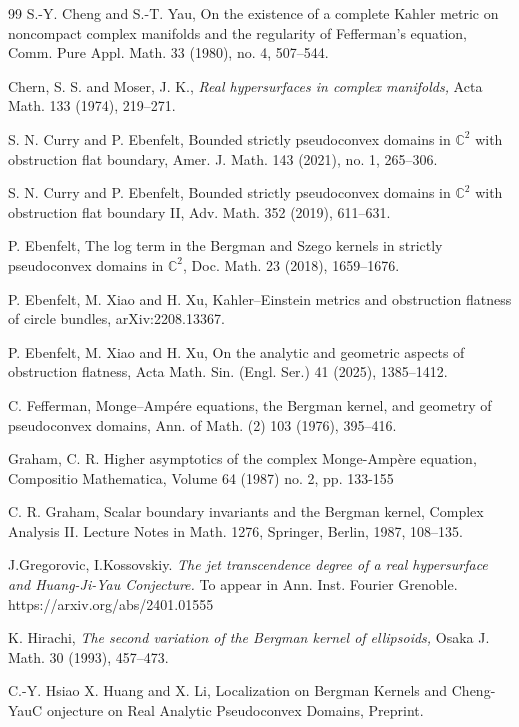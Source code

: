 \documentclass[12pt]{amsart}
\def\CC{\mathbb{C}}
\begin{document}
{{\begin{thebibliography}{99}
 S.-Y. Cheng and S.-T. Yau,
On the existence of a complete Kahler metric on noncompact complex manifolds and the regularity of Fefferman's equation,
Comm. Pure Appl. Math. 33 (1980), no. 4, 507--544.

 Chern, S. S. and Moser, J. K., {\it Real hypersurfaces in complex manifolds,} Acta Math. 133 (1974), 219–271.


 S. N. Curry and P. Ebenfelt,
Bounded strictly pseudoconvex domains in $\CC^2$ with obstruction flat boundary,
Amer. J. Math. 143 (2021), no. 1, 265--306.


 S. N. Curry and P. Ebenfelt,
Bounded strictly pseudoconvex domains in $\CC^2$ with obstruction flat boundary II,
Adv. Math. 352 (2019), 611--631.




 P. Ebenfelt,
The log term in the Bergman and Szego kernels in strictly pseudoconvex domains in $\CC^2$,
Doc. Math. 23 (2018), 1659--1676.


 P. Ebenfelt, M. Xiao and H. Xu,
Kahler--Einstein metrics and obstruction flatness of circle bundles,
arXiv:2208.13367.

  P. Ebenfelt, M. Xiao and H. Xu,
On the analytic and geometric aspects of obstruction flatness,
Acta Math. Sin. (Engl. Ser.) 41 (2025), 1385--1412.

 C. Fefferman,
Monge--Amp\'ere equations, the Bergman kernel, and geometry of pseudoconvex domains,
Ann. of Math. (2) 103 (1976), 395--416.



 Graham, C. R. Higher asymptotics of the complex Monge-Ampère equation, Compositio Mathematica, Volume 64 (1987) no. 2, pp. 133-155

 C. R. Graham, Scalar boundary invariants and the Bergman kernel, Complex Analysis II. Lecture
Notes in Math. 1276, Springer, Berlin, 1987, 108–135.

  J.Gregorovic, I.Kossovskiy. {\it The jet transcendence degree of a real hypersurface and Huang-Ji-Yau Conjecture.} To appear in Ann. Inst. Fourier Grenoble. https://arxiv.org/abs/2401.01555

 K. Hirachi, {\em The second variation of the Bergman kernel of ellipsoids,} Osaka J. Math. 30 (1993),
457–473.

 C.-Y. Hsiao X. Huang and X. Li,  Localization on Bergman Kernels and Cheng-YauC onjecture on Real Analytic Pseudoconvex Domains, Preprint.



\end{thebibliography}}}
\end{document}
